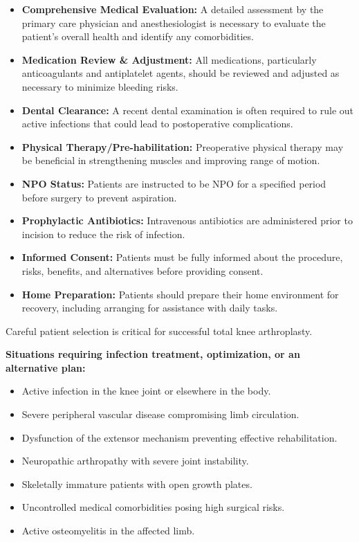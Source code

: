 \begin{itemize}
  \item \textbf{Comprehensive Medical Evaluation:} A detailed assessment by the primary care physician and anesthesiologist is necessary to evaluate the patient's overall health and identify any comorbidities.
  
  \item \textbf{Medication Review \& Adjustment:} All medications, particularly anticoagulants and antiplatelet agents, should be reviewed and adjusted as necessary to minimize bleeding risks.
  
  \item \textbf{Dental Clearance:} A recent dental examination is often required to rule out active infections that could lead to postoperative complications.
  
  \item \textbf{Physical Therapy/Pre-habilitation:} Preoperative physical therapy may be beneficial in strengthening muscles and improving range of motion.
  
  \item \textbf{NPO Status:} Patients are instructed to be NPO for a specified period before surgery to prevent aspiration.
  
  \item \textbf{Prophylactic Antibiotics:} Intravenous antibiotics are administered prior to incision to reduce the risk of infection.
  
  \item \textbf{Informed Consent:} Patients must be fully informed about the procedure, risks, benefits, and alternatives before providing consent.
  
  \item \textbf{Home Preparation:} Patients should prepare their home environment for recovery, including arranging for assistance with daily tasks.
\end{itemize}

Careful patient selection is critical for successful total knee arthroplasty.

\textbf{Situations requiring infection treatment, optimization, or an alternative plan:}
\begin{itemize}
  \item Active infection in the knee joint or elsewhere in the body.
  \item Severe peripheral vascular disease compromising limb circulation.
  \item Dysfunction of the extensor mechanism preventing effective rehabilitation.
  \item Neuropathic arthropathy with severe joint instability.
  \item Skeletally immature patients with open growth plates.
  \item Uncontrolled medical comorbidities posing high surgical risks.
  \item Active osteomyelitis in the affected limb.
\end{itemize}

